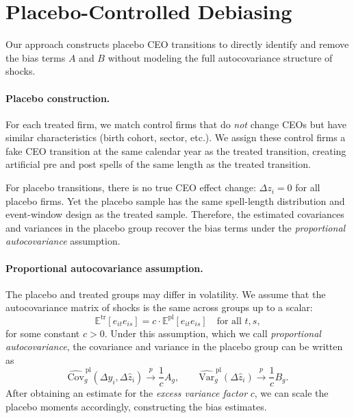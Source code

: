 \documentclass[11pt,a4paper]{article}
\newcommand{\Var}{\text{Var}}
\newcommand{\Cov}{\text{Cov}}
\begin{document}
\section{Placebo-Controlled Debiasing} 

Our approach constructs placebo CEO transitions to directly identify and remove the bias terms $A$ and $B$ without modeling the full autocovariance structure of shocks.

\paragraph{Placebo construction.} For each treated firm, we match control firms that do \emph{not} change CEOs but have similar characteristics (birth cohort, sector, etc.). We assign these control firms a fake CEO transition at the same calendar year as the treated transition, creating artificial pre and post spells of the same length as the treated transition.

For placebo transitions, there is no true CEO effect change: $\Delta z_i = 0$ for all placebo firms. Yet the placebo sample has the same spell-length distribution and event-window design as the treated sample. Therefore, the estimated covariances and variances in the placebo group recover the bias terms under the \emph{proportional autocovariance} assumption.

\paragraph{Proportional autocovariance assumption.} The placebo and treated groups may differ in volatility. We assume that the autocovariance matrix of shocks is the same across groups up to a scalar: 
\begin{equation}
  \mathbb{E}^{\text{tr}}[e_{it} e_{is}] = c \cdot \mathbb{E}^{\text{pl}}[e_{it} e_{is}] \quad \text{for all } t,s,
\end{equation}
for some constant $c>0$. Under this assumption, which we call \emph{proportional autocovariance}, the covariance and variance in the placebo group can be written as 
\begin{equation}
\widehat{\Cov}_g^{\,\text{pl}}(\Delta y_i,\Delta \hat z_i) \xrightarrow{p} \frac{1}{c} A_g,\qquad \widehat{\Var}_g^{\,\text{pl}}(\Delta \hat z_i) \xrightarrow{p} \frac{1}{c} B_g.
\end{equation}
After obtaining an estimate for the \emph{excess variance factor} $c$, we can scale the placebo moments accordingly,  constructing the bias estimates.
\end{document}
